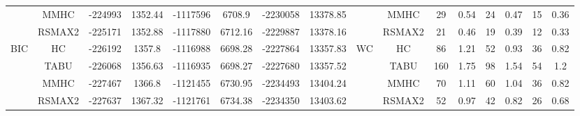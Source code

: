 \begin{table}[p]
{\begin{tabular}{cc||cc|cc|cc||cc|cc|cc|cc}
& MMHC &	-224993 & 	1352.44 & 	-1117596 & 	6708.9 & 	-2230058 & 	13378.85 & 	& MMHC &	29 & 	0.54 & 	24 & 	0.47 & 	15 & 	0.36\tabularnewline													
& RSMAX2 &	-225171 & 	1352.88 & 	-1117880 & 	6712.16 & 	-2229887 & 	13378.16 & 	& RSMAX2 &	21 & 	0.46 & 	19 & 	0.39 & 	12 & 	0.33\tabularnewline													
\hline																										
\multirow{4}{*}{BIC} & HC &	-226192 & 	1357.8 & 	-1116988 & 	6698.28 & 	-2227864 & 	13357.83 & 	\multirow{4}{*}{WC} & HC &	86 & 	1.21 & 	52 & 	0.93 & 	36 & 	0.82\tabularnewline													
& TABU &	-226068 & 	1356.63 & 	-1116935 & 	6698.27 & 	-2227680 & 	13357.52 & 	& TABU &	160 & 	1.75 & 	98 & 	1.54 & 	54 & 	1.2\tabularnewline													
& MMHC &	-227467 & 	1366.8 & 	-1121455 & 	6730.95 & 	-2234493 & 	13404.24 & 	& MMHC &	70 & 	1.11 & 	60 & 	1.04 & 	36 & 	0.82\tabularnewline													
& RSMAX2 &	-227637 & 	1367.32 & 	-1121761 & 	6734.38 & 	-2234350 & 	13403.62 & 	& RSMAX2 &	52 & 	0.97 & 	42 & 	0.82 & 	26 & 	0.68\tabularnewline													
\hline																										
\end{tabular}																										
}																										
\end{table}																										


